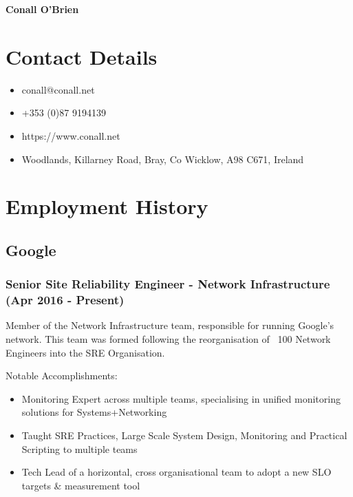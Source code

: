 \documentclass[a4paper, 10pt] {article}
\begin{document}
\begingroup
  \centering
  \LARGE \textbf{Conall O'Brien}\\[1.5em]
\endgroup

\section*{Contact Details}

\begin{itemize}[itemsep=2pt,parsep=2pt]
 \item conall@conall.net
 \item +353 (0)87 9194139
 \item https://www.conall.net
 \item Woodlands, Killarney Road, Bray, Co Wicklow, A98 C671, Ireland
\end{itemize}

\hrulefill

\section*{Employment History}

\subsection*{Google}

\subsubsection*{Senior Site Reliability Engineer - Network Infrastructure (Apr 2016 - Present)}

Member of the Network Infrastructure team, responsible for running Google's network. This team was formed
following the reorganisation of ~100 Network Engineers into the SRE Organisation.

\vspace{4mm}  %

Notable Accomplishments:

\begin{itemize}[itemsep=2pt,parsep=2pt]
  \item Monitoring Expert across multiple teams, specialising in unified monitoring solutions for Systems+Networking
  \item Taught SRE Practices, Large Scale System Design, Monitoring and Practical Scripting to multiple teams
  \item Tech Lead of a horizontal, cross organisational team to adopt a new SLO targets \& measurement tool
\end{itemize}
\end{document}
